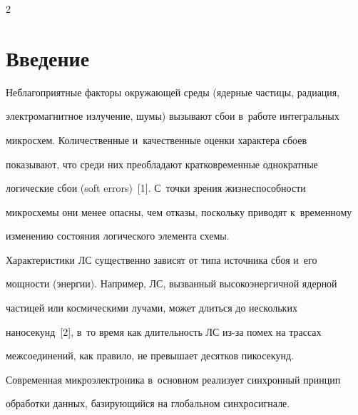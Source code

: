 
  









\thispagestyle{headings}



\begin{multicols}{2}



\label{st\stat}



\section{Введение}



  Неблагоприятные факторы окружающей среды (ядерные частицы, радиация, 

электромагнитное излучение, шумы) вызывают сбои в~работе интегральных 

микросхем. Количественные и~качественные оценки характера сбоев 

показывают, что среди них преобладают кратковременные однократные 

логические сбои (soft errors)~[1]. С~точки зрения жизнеспособности 

микросхемы они менее опасны, чем отказы, поскольку приводят к~временному 

изменению состояния логического элемента схемы.



  

  Характеристики ЛС существенно зависят от типа источника сбоя и~его 

мощности (энергии). Например, ЛС, вызванный высокоэнергичной ядерной 

частицей или космическими лучами, может длиться до нескольких 

наносекунд~[2], в~то время как длительность ЛС из-за помех на трассах 

межсоединений, как правило, не превышает десятков пикосекунд. 

  

  Современная микроэлектроника в~основном реализует синхронный принцип 

обработки данных, базирующийся на глобальном синхросигнале. 


\end{multicols}
